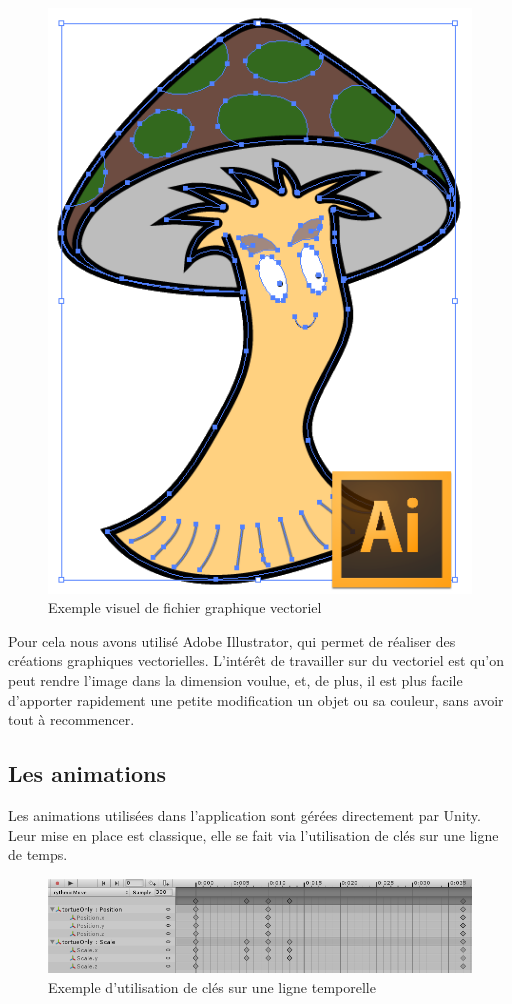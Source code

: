 \begin{figure}[H]\centering
  \includegraphics[scale=.6]{./img/technique_graphismes.png}
  \caption{Exemple visuel de fichier graphique vectoriel}
  \label{SelectionMiniJeu}
\end{figure}

Pour cela nous avons utilisé Adobe Illustrator, qui permet de réaliser des créations graphiques vectorielles. L'intérêt de travailler sur du vectoriel est qu'on peut rendre l'image dans la dimension voulue, et, de plus, il est plus facile d'apporter rapidement une petite modification un objet ou sa couleur, sans avoir tout à recommencer.

\subsection{Les animations}
\label{anims}
Les animations utilisées dans l'application sont gérées directement par Unity. Leur mise en place est classique, elle se fait via l'utilisation de clés sur une ligne de temps. 

\begin{figure}[H]\centering
  \includegraphics[scale=.55]{./img/technique_animation1.png}
  \caption{Exemple d'utilisation de clés sur une ligne temporelle}
  \label{technique_animation1}
\end{figure}


